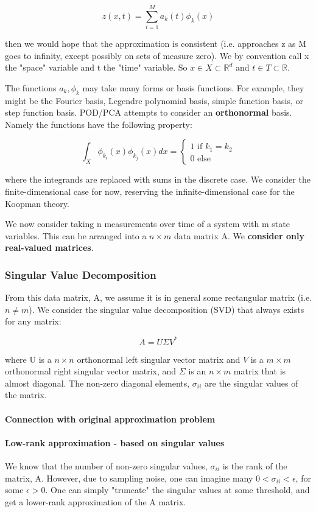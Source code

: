 \documentclass{article}
\theoremstyle{definition}
\theoremstyle{remark}
\theoremstyle{lemma}
\theoremstyle{theorem}
\theoremstyle{corollary}
\theoremstyle{property}
\begin{document}
			$$z(x, t) = \sum_{i=1}^M a_k(t) \phi_k(x)$$

		then we would hope that the approximation is consistent (i.e. approaches z as M goes to infinity, except possibly on sets of measure zero). We by convention call x the "space" variable and t the "time" variable. So $x \in X \subset \mathbb{R}^d$ and $t \in T \subset \mathbb{R}$.

		The functions $a_k, \phi_k$ may take many forms or basis functions. For example, they might be the Fourier basis, Legendre polynomial basis, simple function basis, or step function basis. POD/PCA attempts to consider an \textbf{orthonormal} basis. Namely the functions have the following property:

			$$\int_X \phi_{k_i}(x) \phi_{k_j}(x) dx = \begin{cases} 1 \mbox{ if } k_1 = k_2 \\ 0 \mbox{ else}\end{cases}$$

		where the integrands are replaced with sums in the discrete case. We consider the finite-dimensional case for now, reserving the infinite-dimensional case for the Koopman theory. 

		We now consider taking n measurements over time of a system with m state variables. This can be arranged into a $n \times m$ data matrix A. We \textbf{consider only real-valued matrices}.

		\subsubsection{Singular Value Decomposition}
			From this data matrix, A, we assume it is in general some rectangular matrix (i.e. $n \neq m$). We consider the singular value decomposition (SVD) that always exists for any matrix:

				$$A = U \Sigma V^*$$

			where U is a $n \times n$ orthonormal left singular vector matrix and $V$ is a $m \times m$ orthonormal right singular vector matrix, and $\Sigma$ is an $n \times m$ matrix that is almost diagonal. The non-zero diagonal elements, $\sigma_{ii}$ are the singular values of the matrix.

			\paragraph{Connection with original approximation problem}

			\paragraph{Low-rank approximation - based on singular values}
			We know that the number of non-zero singular values, $\sigma_{ii}$ is the rank of the matrix, A. However, due to sampling noise, one can imagine many $0 < \sigma_{ii} < \epsilon$, for some $\epsilon > 0$. One can simply "truncate" the singular values at some threshold, and get a lower-rank approximation of the A matrix.
\end{document}
